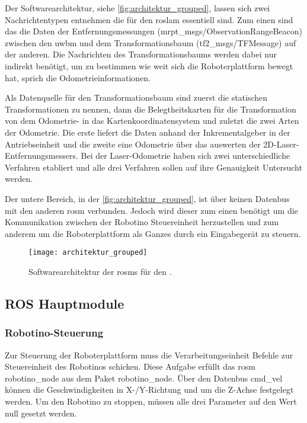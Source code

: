 Der Softwarearchitektur, siehe \autoref{fig:architektur_grouped}, lassen sich zwei Nachrichtentypen entnehmen die für den \gls{roslam} essentiell sind. Zum einen sind das die Daten der Entfernungsmessungen (mrpt\_msgs/ObservationRangeBeacon) zwischen den \gls{uwbm} und dem Transformationsbaum (tf2\_msgs/TFMessage) auf der anderen. Die Nachrichten des Transformationsbaums werden dabei nur indirekt benötigt, um zu bestimmen wie weit sich die Roboterplattform bewegt hat, sprich die Odometrieinformationen.

Als Datenquelle für den Transformationsbaum sind zuerst die statischen Transformationen zu nennen, dann die Belegtheitskarten für die Transformation von dem Odometrie- in das Kartenkoordinatensystem und zuletzt die zwei Arten der Odometrie. Die erste liefert die Daten anhand der Inkrementalgeber in der Antriebseinheit und die zweite eine Odometrie über das auswerten der 2D-Laser-Entfernungsmessers. Bei der Laser-Odometrie haben sich zwei unterschiedliche Verfahren etabliert und alle drei Verfahren sollen auf ihre Genauigkeit Untersucht werden.

Der untere Bereich, in der \autoref{fig:architektur_grouped}, ist über keinen Datenbus mit den anderen \gls{rosm} verbunden. Jedoch wird dieser zum einen benötigt um die Kommunikation zwischen der Robotino Steuereinheit herzustellen und zum anderem um die Roboterplattform als Ganzes durch ein Eingabegerät zu steuern.

\begin{figure}
	\centering
	\texttt{[image: architektur\_grouped]}
	\caption{Softwarearchitektur der \glspl{rosm} für den .}
	\label{fig:architektur_grouped}
\end{figure}


%
%
%
\subsection{ROS Hauptmodule}


%
%
\subsubsection{Robotino-Steuerung}

Zur Steuerung der Roboterplattform muss die Verarbeitungseinheit Befehle zur Steuereinheit des Robotinos schicken. Diese Aufgabe erfüllt das \Gls{rosm} robotino\_node aus dem Paket robotino\_node. Über den Datenbus cmd\_vel können die Geschwindigkeiten in X-/Y-Richtung und um die Z-Achse festgelegt werden. Um den Robotino zu stoppen, müssen alle drei Parameter auf den Wert null gesetzt werden.

